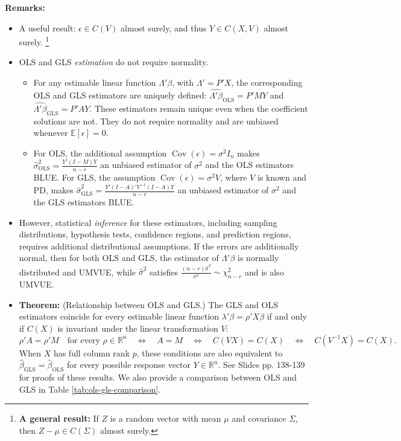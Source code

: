 \documentclass{article}
\theoremstyle{break}
\newcommand{\R}{\ensuremath{\mathbb{R}}}
\newcommand{\E}{\ensuremath{\mathbb{E}}}
\DeclareMathOperator{\Cov}{Cov}
\begin{document}
\textbf{Remarks:} 
\begin{itemize}
    \item A useful result: $\epsilon \in C(V)$ almost surely, and thus $Y \in C(X,V)$ almost surely.
    \footnote{\textbf{A general result:} If $Z$ is a random vector with mean $\mu$ and covariance $\Sigma$, then $Z-\mu \in C(\Sigma)$ almost surely.} 
    \item OLS and GLS \emph{estimation} do not require normality.
    \begin{itemize}
        \item For any estimable linear function $\Lambda'\beta$, with $\Lambda'=P'X$, the corresponding OLS and GLS estimators are uniquely defined:
        $\hat{\Lambda'\beta}_{\mathrm{OLS}}=P'MY$ and
        $\hat{\Lambda'\beta}_{\mathrm{GLS}}=P'AY$.
        These estimators remain unique even when the coefficient solutions are not. They do not require normality and are unbiased whenever $\E[\epsilon]=0$.
        \item For OLS, the additional assumption $\Cov(\epsilon)=\sigma^2 I_n$ makes
        $\hat\sigma^2_{\mathrm{OLS}}=\frac{Y'(I-M)Y}{n-r}$
        an unbiased estimator of $\sigma^2$ and the OLS estimators BLUE.
        For GLS, the assumption $\Cov(\epsilon)=\sigma^2V$, where $V$ is known and PD, makes
        $\hat\sigma^2_{\mathrm{GLS}}=\frac{Y'(I-A)'V^{-1}(I-A)Y}{n-r}$
        an unbiased estimator of $\sigma^2$ and the GLS estimators BLUE.
    \end{itemize}
    \item However, statistical \emph{inference} for these estimators, including sampling distributions, hypothesis tests, confidence regions, and prediction regions, requires additional distributional assumptions. If the errors are additionally normal, then for both OLS and GLS, the estimator of $\Lambda'\beta$ is normally distributed and UMVUE, while $\hat\sigma^2$ satisfies $\frac{(n-r)\hat\sigma^2}{\sigma^2}\sim\chi^2_{n-r}$ and is also UMVUE.
    \item \textbf{Theorem:} (Relationship between OLS and GLS.) The GLS and OLS estimators coincide for every estimable linear function $\lambda'\beta=\rho'X\beta$ if and only if $C(X)$ is invariant under the linear transformation $V$:
    \[
    \rho'A=\rho'M
    \quad \text{for every } \rho\in\R^n
    \quad\Longleftrightarrow\quad
    A=M
    \quad\Longleftrightarrow\quad
    C(VX)=C(X)
    \quad\Longleftrightarrow\quad 
    C(V^{-1}X) = C(X).
    \]
    When $X$ has full column rank $p$, these conditions are also equivalent to $\hat\beta_{\mathrm{GLS}}=\hat\beta_{\mathrm{OLS}}$ for every possible response vector $Y\in\R^n$.
    See Slides pp. 138-139 for proofs of these results. We also provide a comparison between OLS and GLS in Table \ref{tab:ols-gls-comparison}.
\end{itemize}
\end{document}
